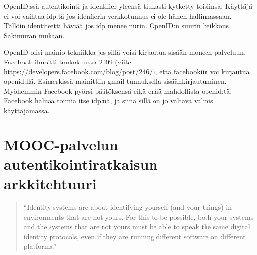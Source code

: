 \documentclass[finnish,gradu]{tktltiki}
\begin{document}

  OpenID:ssä autentikointi ja identifier yleensä tiukasti kytketty toisiinsa. Käyttäjä ei voi vaihtaa idp:tä jos idenfierin verkkotunnus ei ole hänen hallinnassaan. Tällöin identiteetti häviää jos idp menee nurin. OpenID:n suurin heikkous Sakimuran mukaan.

  OpenID olisi mainio tekniikka jos sillä voisi kirjautua sisään moneen palveluun.
  Facebook ilmoitti toukokuussa 2009 (viite https://developers.facebook.com/blog/post/246/), että facebookiin voi kirjautua openid:llä. Esimerkissä mainittiin gmail tunnuksella sisäänkirjautuminen. Myöhemmin Facebook pyörsi päätöksensä eikä enää mahdollista openid:tä. Facebook haluaa toimia itse idp:nä, ja siinä sillä on jo valtava valmis käyttäjämassa.










\newpage
\section{MOOC-palvelun autentikointiratkaisun arkkitehtuuri} %
\label{sec:mooc_palvelun_autentikointiratkaisun_arkkitehtuuri}

  \begin{quote}
    ``Identity systems are about identifying yourself (and your things) in environments that are not yours.
    For this to be possible, both your systems and the systems that are not yours
    must be able to speak the same digital identity protocols,
    even if they are running different software on different platforms.''~\cite{cameron_id_arch_2006}
  \end{quote}
\end{document}
